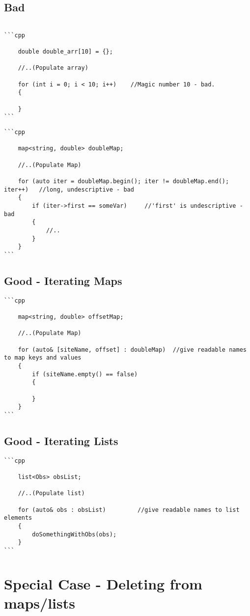 \subsection{Bad}
\begin{verbatim}

```cpp

    double double_arr[10] = {};

    //..(Populate array)

    for (int i = 0; i < 10; i++)    //Magic number 10 - bad.
    {

    }
```
\end{verbatim}
%
\begin{verbatim}
```cpp

    map<string, double> doubleMap;

    //..(Populate Map)

    for (auto iter = doubleMap.begin(); iter != doubleMap.end(); iter++)   //long, undescriptive - bad
    {
    	if (iter->first == someVar)     //'first' is undescriptive - bad
    	{
    		//..
    	}
    }
```
\end{verbatim}
\subsection{Good - Iterating Maps}
\begin{verbatim}
```cpp

    map<string, double> offsetMap;

    //..(Populate Map)

    for (auto& [siteName, offset] : doubleMap)	//give readable names to map keys and values
    {
        if (siteName.empty() == false)
        {
        
        }
    }
```
\end{verbatim}
\subsection{ Good - Iterating Lists}
\begin{verbatim}
```cpp

    list<Obs> obsList;

    //..(Populate list)

    for (auto& obs : obsList)         //give readable names to list elements
    {
        doSomethingWithObs(obs);
    }
```
\end{verbatim}

\section{Special Case - Deleting from maps/lists}

